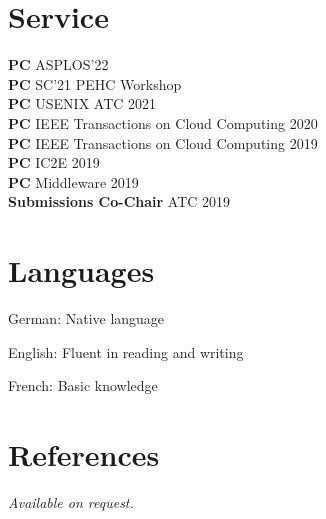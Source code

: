 \documentclass[margin,line]{cv/cv}
\begin{document}
\begin{resume}

    \section{\mysidestyle Service}
    \textbf{PC} ASPLOS'22\\%
    \textbf{PC} SC’21 PEHC Workshop \\%
    \textbf{PC} USENIX ATC 2021 \\%
    \textbf{PC} IEEE Transactions on Cloud Computing 2020 \\%
    \textbf{PC} IEEE Transactions on Cloud Computing 2019 \\%
    \textbf{PC} IC2E 2019 \\%
    \textbf{PC} Middleware 2019 \\%
    \textbf{Submissions Co-Chair} ATC 2019 \\%


    \section{\mysidestyle Languages}
    \begin{list2}
        \item German: Native language
        \item English: Fluent in reading and writing
        \item French: Basic knowledge
    \end{list2}\vspace{-1.5mm}


    \section{\mysidestyle References}
     {\sl Available on request.}


\end{resume}
\end{document}
